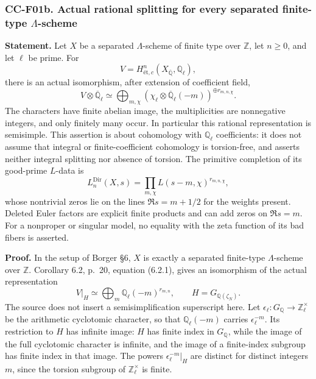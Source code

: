 \documentclass[11pt,a4paper]{article}
\theoremstyle{definition}\newtheorem{definition}[theorem]{Definition}
\theoremstyle{remark}\newtheorem{remark}[theorem]{Remark}
\begin{document}
\subsubsection{\texorpdfstring{CC-F01b. Actual rational splitting for
every separated finite-type
\(\Lambda\)-scheme}{CC-F01b. Actual rational splitting for every separated finite-type \textbackslash Lambda-scheme}}\label{cc-f01b.-actual-rational-splitting-for-every-separated-finite-type-lambda-scheme}

\textbf{Statement.} Let \(X\) be a separated \(\Lambda\)-scheme of
finite type over \(\mathbb Z\), let \(n\ge0\), and let \(\ell\) be
prime. For \[
 V=H^n_{\text{ét},c}(X_{\overline{\mathbb Q}},\mathbb Q_\ell),
\] there is an actual isomorphism, after extension of coefficient field,
\[
 V\otimes\overline{\mathbb Q}_\ell
 \simeq\bigoplus_{m,\chi}
 (\chi_\ell\otimes\overline{\mathbb Q}_\ell(-m))^{\oplus r_{m,n,\chi}}.
 \tag{CC-F01b.1}
\] The characters have finite abelian image, the multiplicities are
nonnegative integers, and only finitely many occur. In particular this
rational representation is semisimple. This assertion is about
cohomology with \(\mathbb Q_\ell\) coefficients: it does not assume that
integral or finite-coefficient cohomology is torsion-free, and asserts
neither integral splitting nor absence of torsion. The primitive
completion of its good-prime \(L\)-data is \[
 L_n^{\mathrm{Dir}}(X,s)=\prod_{m,\chi}L(s-m,\chi)^{r_{m,n,\chi}},
 \tag{CC-F01b.2}
\] whose nontrivial zeros lie on the lines \(\Re s=m+1/2\) for the
weights present. Deleted Euler factors are explicit finite products and
can add zeros on \(\Re s=m\). For a nonproper or singular model, no
equality with the zeta function of its bad fibers is asserted.

\textbf{Proof.} In the setup of Borger §6, \(X\) is exactly a separated
finite-type \(\Lambda\)-scheme over \(\mathbb Z\). Corollary 6.2, p.~20,
equation (6.2.1), gives an isomorphism of the actual representation \[
 V|_H\simeq\bigoplus_m\mathbb Q_\ell(-m)^{r_{m,n}},
 \qquad H=G_{\mathbb Q(\zeta_N)}.
\] The source does not insert a semisimplification superscript here. Let
\(\epsilon_\ell:G_\mathbb Q\to\mathbb Z_\ell^\times\) be the arithmetic
cyclotomic character, so that \(\mathbb Q_\ell(-m)\) carries
\(\epsilon_\ell^{-m}\). Its restriction to \(H\) has infinite image:
\(H\) has finite index in \(G_\mathbb Q\), while the image of the full
cyclotomic character is infinite, and the image of a finite-index
subgroup has finite index in that image. The powers
\(\epsilon_\ell^{-m}|_H\) are distinct for distinct integers \(m\),
since the torsion subgroup of \(\mathbb Z_\ell^\times\) is finite.
\end{document}
